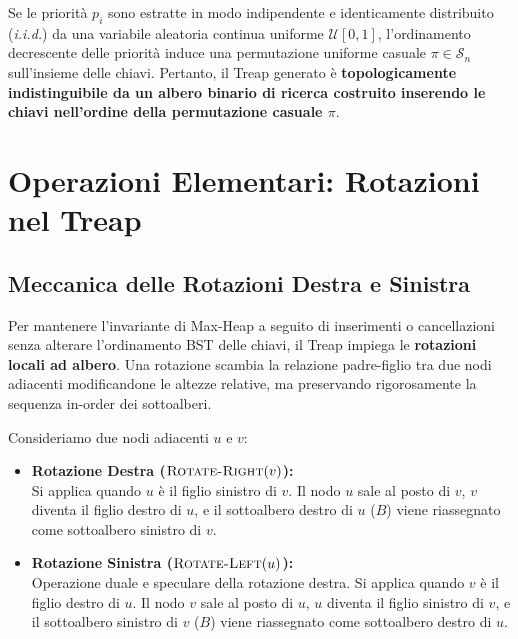 \begin{corollary}
Se le priorit\`a $p_i$ sono estratte in modo indipendente e identicamente distribuito (\textit{i.i.d.}) da una variabile aleatoria continua uniforme $\mathcal{U}[0, 1]$, l'ordinamento decrescente delle priorit\`a induce una permutazione uniforme casuale $\pi \in \mathcal{S}_n$ sull'insieme delle chiavi. Pertanto, il Treap generato \`e \textbf{topologicamente indistinguibile da un albero binario di ricerca costruito inserendo le chiavi nell'ordine della permutazione casuale $\pi$}.
\end{corollary}

\FloatBarrier
\section{Operazioni Elementari: Rotazioni nel Treap}
\label{sec:tree-rotations}

\subsection{Meccanica delle Rotazioni Destra e Sinistra}
Per mantenere l'invariante di Max-Heap a seguito di inserimenti o cancellazioni senza alterare l'ordinamento BST delle chiavi, il Treap impiega le \textbf{rotazioni locali ad albero}. Una rotazione scambia la relazione padre-figlio tra due nodi adiacenti modificandone le altezze relative, ma preservando rigorosamente la sequenza in-order dei sottoalberi.

Consideriamo due nodi adiacenti $u$ e $v$:
\begin{itemize}
    \item \textbf{Rotazione Destra ($\textsc{Rotate-Right}(v)$):}\\
    Si applica quando $u$ \`e il figlio sinistro di $v$. Il nodo $u$ sale al posto di $v$, $v$ diventa il figlio destro di $u$, e il sottoalbero destro di $u$ ($B$) viene riassegnato come sottoalbero sinistro di $v$.
    
    \item \textbf{Rotazione Sinistra ($\textsc{Rotate-Left}(u)$):}\\
    Operazione duale e speculare della rotazione destra. Si applica quando $v$ \`e il figlio destro di $u$. Il nodo $v$ sale al posto di $u$, $u$ diventa il figlio sinistro di $v$, e il sottoalbero sinistro di $v$ ($B$) viene riassegnato come sottoalbero destro di $u$.
\end{itemize}


